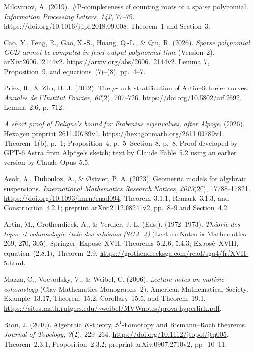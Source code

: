 Milovanov, A. (2019). \#P-completeness of counting roots of a sparse polynomial. \emph{Information Processing Letters, 142}, 77--79. \url{https://doi.org/10.1016/j.ipl.2018.09.008}. Theorem~1 and Section~3.

Cao, Y., Feng, R., Gao, X.-S., Huang, Q.-L., \& Qiu, R. (2026). \emph{Sparse polynomial GCD cannot be computed in fixed-output polynomial time} (Version~2). arXiv:2606.12144v2. \url{https://arxiv.org/abs/2606.12144v2}. Lemma~7, Proposition~9, and equations~(7)--(8), pp.~4--7.

Pries, R., \& Zhu, H. J. (2012). The $p$-rank stratification of Artin--Schreier curves. \emph{Annales de l'Institut Fourier, 62}(2), 707--726. \url{https://doi.org/10.5802/aif.2692}. Lemma~2.6, p.~712.

\emph{A short proof of Deligne's bound for Frobenius eigenvalues, after Alp\"oge}. (2026). Hexagon preprint 2611.00789v1. \url{https://hexagonmath.org/2611.00789v1}. Theorem~1(b), p.~1; Proposition~4, p.~5; Section~8, p.~8. Proof developed by GPT-6 Astra from Alp\"oge's sketch; text by Claude Fable~5.2 using an earlier version by Claude Opus~5.5.

Asok, A., Dubouloz, A., \& \O stv\ae r, P. A. (2023). Geometric models for algebraic suspensions. \emph{International Mathematics Research Notices, 2023}(20), 17788--17821. \url{https://doi.org/10.1093/imrn/rnad094}. Theorem~3.1.1, Remark~3.1.3, and Construction~4.2.1; preprint arXiv:2112.08241v2, pp.~8--9 and Section~4.2.

Artin, M., Grothendieck, A., \& Verdier, J.-L. (Eds.). (1972--1973). \emph{Th\'eorie des topos et cohomologie \'etale des sch\'emas (SGA~4)} (Lecture Notes in Mathematics 269, 270, 305). Springer. Expos\'e~XVII, Theorems~5.2.6, 5.4.3; Expos\'e~XVIII, equation~(2.8.1), Theorem~2.9. \url{https://grothendiecksga.com/read/sga4/fr/XVII-5.html}.

Mazza, C., Voevodsky, V., \& Weibel, C. (2006). \emph{Lecture notes on motivic cohomology} (Clay Mathematics Monographs~2). American Mathematical Society. Example~13.17, Theorem~15.2, Corollary~15.5, and Theorem~19.1. \url{https://sites.math.rutgers.edu/~weibel/MVWnotes/prova-hyperlink.pdf}.

Riou, J. (2010). Algebraic $K$-theory, $\mathbb A^1$-homotopy and Riemann--Roch theorems. \emph{Journal of Topology, 3}(2), 229--264. \url{https://doi.org/10.1112/jtopol/jtq005}. Theorem~2.3.1, Proposition~2.3.2; preprint arXiv:0907.2710v2, pp.~10--11.

